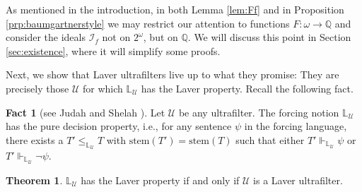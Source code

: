 \documentclass[12pt]{article}
\theoremstyle{definition}
\newtheorem{thm}[nummer]{\sc Theorem}
\newtheorem{fct}[nummer]{\sc Fact}
\begin{document}
 As mentioned in the introduction, in both Lemma \ref{lem:Ff} and in Proposition \ref{prp:baumgartnerstyle} we may restrict our attention to functions $F: \omega \to \mathbb{Q}$ and consider the ideals $\mathcal{I}_f$ not on $2^\omega$, but on $\mathbb{Q}$. We will discuss this point in Section \ref{sec:existence}, where it will simplify some proofs.

Next, we show that Laver ultrafilters live up to what they promise: They are precisely those $\mathcal{U}$ for which $\mathbb{L}_{\mathcal{U}}$ has the Laver property. Recall the following fact.

\begin{fct}[see Judah and Shelah {\cite[Theorem 1.7]{Sh:321}}]
Let $\mathcal{U}$ be any ultrafilter. The forcing notion $\mathbb{L}_{\mathcal{U}}$ has the pure decision property, i.e., for any sentence $\psi$ in the forcing language, there exists a $T' \leq_{\mathbb{L}_{\mathcal{U}}} T$ with $\text{stem}(T')=\text{stem}(T)$ such that either $T' \Vdash_{\mathbb{L}_{\mathcal{U}}} \psi$ or $T' \Vdash_{\mathbb{L}_{\mathcal{U}}} \neg\psi$.	
\end{fct}

\begin{thm}\label{thm:laverprop}
	$\mathbb{L}_{\mathcal{U}}$ has the Laver property if and only if $\mathcal{U}$ is a Laver ultrafilter.
\end{thm}
\end{document}
